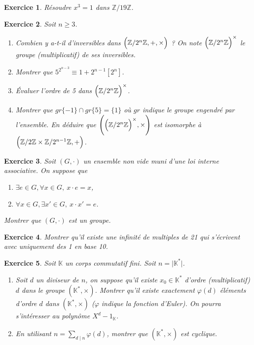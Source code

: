 \documentclass[12pt]{article}
\newtheorem{exercise}{Exercice}[section]
\theoremstyle{remark}
\theoremstyle{remark}
\newcommand{\K}{\mathbb{K}}
\newcommand{\Z}{\mathbb{Z}}
\begin{document}
\begin{exercise}
	Résoudre $x^{3}=1$ dans $\Z/19\Z$.
\end{exercise}

\begin{exercise}
	Soit $n\geqslant 3$.
	\begin{enumerate}
		\item Combien y a-t-il d'inversibles dans
		$\Bigl(\Z/2^{n}\Z,+,\times\Bigr)$ ? On note
		$\Bigl(\Z/2^{n}\Z\Bigr)^{\times}$ le groupe (multiplicatif) de ses
		inversibles.
		\item Montrer que $5^{2^{n-3}}\equiv 1+2^{n-1}[2^{n}]$.
		\item Évaluer l'ordre de 5 dans $\Bigl(\Z/2^{n}\Z\Bigr)^{\times}$.
		\item Montrer que $gr\{-1\}\cap gr\{5\}=\{1\}$ où $gr$ indique le groupe
		engendré par l'ensemble. En déduire que
		$\Biggl(\Bigl(\Z/2^{n}\Z\Bigr)^{\times},\times\Biggr)$ est isomorphe à $\Bigl(\Z/2\Z\times\Z/2^{n-1}\Z,+\Bigr)$.
	\end{enumerate}
\end{exercise}

\begin{exercise}
	Soit $(G,\cdot)$ un ensemble non vide muni d'une loi interne associative. On
	suppose que
	\begin{enumerate}
		\item [(i)] $\exists e\in G,\forall x\in G,~x\cdot e=x$,
		\item [(ii)] $\forall x\in G,\exists x'\in G,~x\cdot x'=e$.
	\end{enumerate}
	Montrer que $(G,\cdot)$ est un groupe.
\end{exercise}

\begin{exercise}
	Montrer qu'il existe une infinité de multiples de 21 qui s'écrivent avec
	uniquement des 1 en base 10.
\end{exercise}

\begin{exercise}
	Soit $\K$ un corps commutatif fini. Soit $n=\vert \K^{*}\vert$.
	\begin{enumerate}
		\item Soit $d$ un diviseur de  $n$, on suppose qu'il existe $x_{0}\in
		\K^{*}$ d'ordre (multiplicatif) $d$ dans le groupe $(\K^{*},\times)$.
		Montrer qu'il existe exactement $\varphi(d)$ éléments d'ordre $d$ dans
		$(\K^{*},\times)$ ($\varphi$ indique la fonction d'Euler). On pourra
		s'intéresser au polynôme $X^{d}-1_{\K}$.
		\item En utilisant $n=\sum_{d\mid n}\varphi(d)$, montrer que
		$(\K^{*},\times)$ est cyclique.
	\end{enumerate}
\end{exercise}
\end{document}
